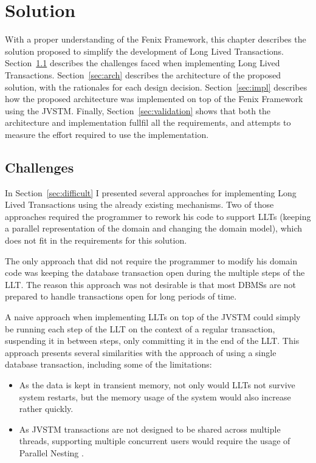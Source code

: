 \documentclass{llncs}
\begin{document}

\section{Solution}
\label{chap:solution}

With a proper understanding of the Fenix Framework, this chapter
describes the solution proposed to simplify the development of Long
Lived Transactions. Section~\ref{sec:challenges} describes the
challenges faced when implementing Long Lived
Transactions. Section~\ref{sec:arch} describes the architecture of the
proposed solution, with the rationales for each design
decision. Section~\ref{sec:impl} describes how the proposed
architecture was implemented on top of the Fenix Framework using the
JVSTM. Finally, Section~\ref{sec:validation} shows that both the
architecture and implementation fullfil all the requirements, and
attempts to measure the effort required to use the implementation.

\subsection{Challenges}
\label{sec:challenges}

In Section~\ref{sec:difficult} I presented several approaches for
implementing Long Lived Transactions using the already existing
mechanisms. Two of those approaches required the programmer to rework
his code to support LLTs (keeping a parallel representation of the
domain and changing the domain model), which does not fit in the
requirements for this solution.

The only approach that did not require the programmer to modify his
domain code was keeping the database transaction open during the
multiple steps of the LLT. The reason this approach was not desirable
is that most DBMSs are not prepared to handle transactions open for
long periods of time.

A naive approach when implementing LLTs on top of the JVSTM could
simply be running each step of the LLT on the context of a regular
transaction, suspending it in between steps, only committing it in the
end of the LLT. This approach presents several similarities with the
approach of using a single database transaction, including some of the
limitations:

\begin{itemize}

\item As the data is kept in transient memory, not only would LLTs not
  survive system restarts, but the memory usage of the system would
  also increase rather quickly.

\item As JVSTM transactions are not designed to be shared across
  multiple threads, supporting multiple concurrent users would
  require the usage of Parallel Nesting
  \cite{NunoMiguelLourencoDiegues2012}.

\end{itemize}
\end{document}
